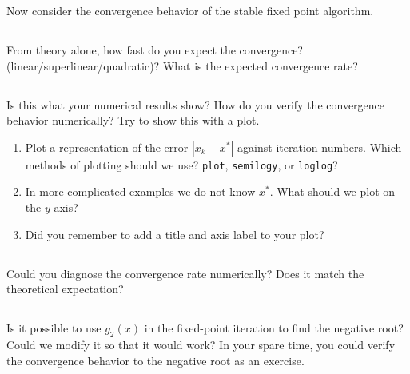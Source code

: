 \documentclass[11pt,letterpaper]{report}
\begin{document}
Now consider the convergence behavior of the stable fixed point algorithm. 

\subsection{}
From theory alone, how fast do you expect the convergence? (linear/superlinear/quadratic)? What is the expected convergence rate?

\subsection{}
Is this what your numerical results show? How do you verify the convergence behavior numerically? Try to show this with a plot. 
\begin{enumerate}
    \item Plot a representation of the error $|x_k-x^*|$ against iteration numbers. Which methods of plotting should we use? \texttt{plot}, \texttt{semilogy}, or \texttt{loglog}?
    \item In more complicated examples we do not know $x^*$. What should we plot on the $y$-axis?
    \item Did you remember to add a title and axis label to your plot?
\end{enumerate}

\subsection{}
Could you diagnose the convergence rate numerically? Does it match the theoretical expectation?

\subsection{}
Is it possible to use $g_2(x)$ in the fixed-point iteration to find the negative root? Could we modify it so that it would work? In your spare time, you could verify the convergence behavior to the negative root as an exercise. 

\end{document}
